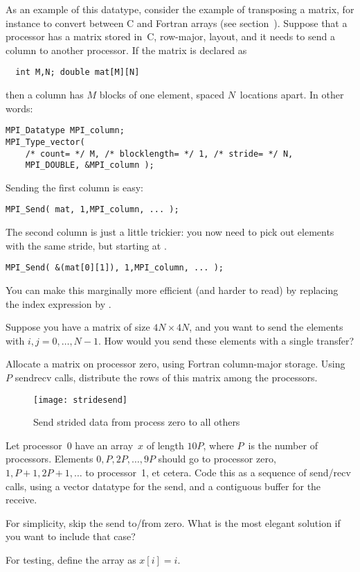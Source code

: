As an example of this datatype, consider the example of transposing
a matrix, for instance to convert between
C and Fortran arrays (see section~). Suppose that 
a processor has a matrix stored in~C, row-major, layout, and it needs
to send a column to another processor. If the matrix is declared as
\begin{lstlisting}
  int M,N; double mat[M][N]
\end{lstlisting}
then a column has $M$ blocks of one element, spaced $N$~locations apart.
In other words:
\begin{lstlisting}
MPI_Datatype MPI_column;
MPI_Type_vector( 
    /* count= */ M, /* blocklength= */ 1, /* stride= */ N,
    MPI_DOUBLE, &MPI_column );
\end{lstlisting}
Sending the first column is easy:
\begin{lstlisting}
MPI_Send( mat, 1,MPI_column, ... );
\end{lstlisting}
The second column is just a little trickier: you now need to pick out 
elements with the same stride, but starting at .
\begin{lstlisting}
MPI_Send( &(mat[0][1]), 1,MPI_column, ... );
\end{lstlisting}
You can make this marginally more efficient (and harder to read)
by replacing the index expression by .

\begin{exercise}
  Suppose you have a matrix of size $4N\times 4N$, and you want to
  send the elements  with $i,j=0,\ldots,N-1$. How would
  you send these elements with a single transfer?
\end{exercise}

\begin{exercise}
  \label{ex:col-to-row}
  Allocate a matrix on processor zero, using Fortran column-major storage.
  Using $P$ sendrecv calls, distribute the rows of this matrix among the
  processors.
\end{exercise}

\begin{figure}[ht]
  \texttt{[image: stridesend]}
  \caption{Send strided data from process zero to all others}
  \label{fig:stridesend}
\end{figure}

\begin{exercise}
  \label{ex:stridesend}
  Let processor~0 have an array~$x$ of length $10P$, where $P$~is the number of processors.
  Elements $0,P,2P,\ldots,9P$ should go to processor zero, $1,P+1,2P+1,\ldots$ to processor~1,
  et cetera. Code this as a sequence of send/recv calls, using a vector datatype
  for the send, and a contiguous buffer for the receive.

  For simplicity, skip the send to/from zero. What is the most elegant
  solution if you want to include that case?

  For testing, define the array as $x[i]=i$.
\end{exercise}

